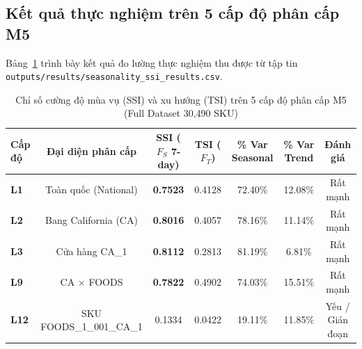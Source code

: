 \documentclass[12pt,a4paper,oneside]{article}
\begin{document}
\subsection{Kết quả thực nghiệm trên 5 cấp độ phân cấp M5}

Bảng~\ref{tab:ssi_results} trình bày kết quả đo lường thực nghiệm thu được từ tập tin \texttt{outputs/results/seasonality\_ssi\_results.csv}.

\begin{table}[htbp]
\centering
\caption{Chỉ số cường độ mùa vụ (SSI) và xu hướng (TSI) trên 5 cấp độ phân cấp M5 (Full Dataset 30,490 SKU)}
\label{tab:ssi_results}
\begin{tabular}{lcccccc}
\toprule
\textbf{Cấp độ} & \textbf{Đại diện phân cấp} & \textbf{SSI ($F_S$ 7-day)} & \textbf{TSI ($F_T$)} & \textbf{\% Var Seasonal} & \textbf{\% Var Trend} & \textbf{Đánh giá} \\
\midrule
\textbf{L1} & Toàn quốc (National)      & \textbf{0.7523} & 0.4128 & 72.40\% & 12.08\% & Rất mạnh \\
\textbf{L2} & Bang California (CA)     & \textbf{0.8016} & 0.4057 & 78.16\% & 11.14\% & Rất mạnh \\
\textbf{L3} & Cửa hàng CA\_1           & \textbf{0.8112} & 0.2813 & 81.19\% & 6.81\%  & Rất mạnh \\
\textbf{L9} & CA $\times$ FOODS        & \textbf{0.7822} & 0.4902 & 74.03\% & 15.51\% & Rất mạnh \\
\textbf{L12}& SKU FOODS\_1\_001\_CA\_1 & 0.1334          & 0.0422 & 19.11\% & 11.85\% & Yếu / Gián đoạn \\
\bottomrule
\end{tabular}
\end{table}
\end{document}
